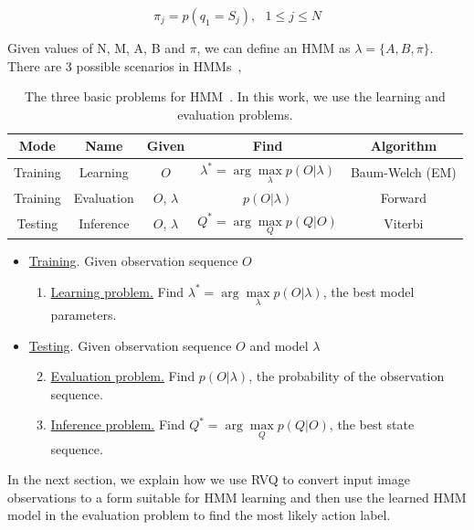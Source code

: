 \begin{Body}
\begin{equation}
\pi_j = p(q_1=S_j), \ \ \ 1\leq j \leq N
\end{equation}

Given values of N, M, A, B and $\pi$, we can define an HMM as $\lambda=\{A, B, \pi\}$.  There are 3 possible scenarios in HMMs~\cite{1989_JNL_TutorialHMM_Rabiner},


\begin{table}[t]
\centering
\begin{tabular}{|c|c|c|c|c|}\hline
\textbf{Mode} & \textbf{Name} & \textbf{Given}& \textbf{Find}& \textbf{Algorithm}\\\hline\hline
Training & Learning & $O$ & $\lambda^* = \arg\max\limits_\lambda p(O|\lambda)$ &Baum-Welch (EM)\\\hline
Training & Evaluation & $O$, $\lambda$ & $p(O|\lambda)$&Forward\\\hline
Testing & Inference & $O$, $\lambda$ & $Q^* = \arg\max\limits_Q p(Q|O)$&Viterbi\\\hline
\end{tabular}
\caption{The three basic problems for HMM~\cite{1989_JNL_TutorialHMM_Rabiner}.  In this work, we use the learning and evaluation problems.}
\end{table}


\begin{itemize}
\item \underline{Training}.  Given observation sequence $O$
\begin{enumerate}
\item \underline{Learning problem.}  Find $\lambda^* = \arg\max\limits_\lambda p(O|\lambda)$, the best model parameters.
\end{enumerate}
\item \underline{Testing}.  Given observation sequence $O$ and model $\lambda$
\begin{enumerate}\setcounter{enumi}{1}
\item \underline{Evaluation problem.}  Find $p(O|\lambda)$, the probability of the observation sequence.
\item \underline{Inference problem.}  Find $Q^* = \arg\max\limits_Q p(Q|O)$, the best state sequence.
\end{enumerate}
\end{itemize}

In the next section, we explain how we use RVQ to convert input image observations to a form suitable for HMM learning and then use the learned HMM model in the evaluation problem to find the most likely action label.


\end{Body}
